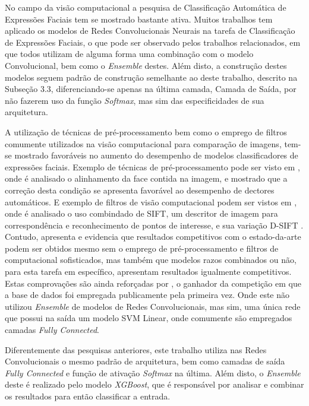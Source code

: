No campo da visão computacional a pesquisa de Classificação Automática de Expressões Faciais tem se mostrado bastante ativa. Muitos trabalhos tem aplicado os modelos de Redes Convolucionais Neurais na tarefa de Classificação de Expressões Faciais, o que pode ser observado pelos trabalhos relacionados, em que todos utilizam de alguma forma uma combinação com o modelo Convolucional, bem como o \textit{Ensemble} destes. Além disto, a construção destes modelos seguem padrão de construção semelhante ao deste trabalho, descrito na Subseção 3.3, diferenciando-se apenas na última camada, Camada de Saída, por não fazerem uso da função \textit{Softmax}, mas sim das especificidades de sua arquitetura.

A utilização de técnicas de pré-processamento bem como o emprego de filtros comumente utilizados na visão computacional para comparação de imagens, tem-se mostrado favoráveis no aumento do desempenho de modelos classificadores de expressões faciais.  Exemplo de técnicas de pré-processamento pode ser visto em \cite{Kim2016FusingAA}, onde é analisado o alinhamento da face contida na imagem, e mostrado que a correção desta condição se apresenta favorável ao desempenho de dectores automáticos.  E exemplo de filtros de visão computacional podem ser vistos em \cite{al2016facial}, onde é analisado o uso combindado de SIFT, um descritor de imagem para correspondência e reconhecimento de pontos de interesse, e sua variação D-SIFT \cite{lindeberg2012scale}. Contudo, \cite{DBLP:journals/corr/PramerdorferK16} apresenta e evidencia que resultados competitivos com o estado-da-arte podem ser obtidos mesmo sem o emprego de pré-processamento e filtros de computacional sofisticados, mas também que modelos razos combinados ou não, para esta tarefa em específico, apresentam resultados igualmente competitivos. Estas comprovações são ainda reforçadas por \cite{DBLP:journals/corr/Tang13}, o ganhador da competição em que a base de dados foi empregada publicamente pela primeira vez. Onde este não utilizou \textit{Ensemble} de modelos de Redes Convolucionais, mas sim, uma única rede que possui na saída um modelo SVM Linear, onde comumente são empregados camadas \textit{Fully Connected}.

Diferentemente das pesquisas anteriores, este trabalho utiliza nas Redes Convolucionais o mesmo padrão de arquitetura, bem como camadas de saída \textit{Fully Connected} e função de ativação \textit{Softmax} na última. Além disto, o \textit{Ensemble} deste é realizado pelo modelo \textit{XGBoost}, que é responsável por analisar e combinar os resultados para então classificar a entrada.
